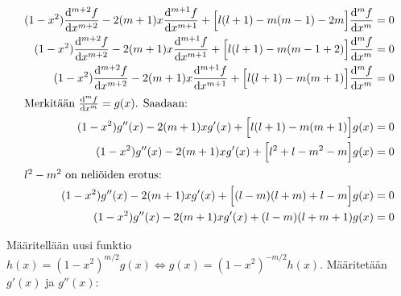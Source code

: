 \documentclass[../johdoksia.tex]{subfiles}
\begin{document}
	\begin{align*}
		(1 - x^2)\odv{^{m + 2}f}{x^{m + 2}} - 2(m + 1)x\odv{^{m + 1}f}{x^{m + 1}} + \Big[l(l + 1) - m(m - 1) - 2m\Big]\odv{^mf}{x^m} &= 0 \\
		(1 - x^2)\odv{^{m + 2}f}{x^{m + 2}} - 2(m + 1)x\odv{^{m + 1}f}{x^{m + 1}} + \Big[l(l + 1) - m(m - 1 + 2)\Big]\odv{^mf}{x^m} &= 0 \\
		(1 - x^2)\odv{^{m + 2}f}{x^{m + 2}} - 2(m + 1)x\odv{^{m + 1}f}{x^{m + 1}} + \Big[l(l + 1) - m(m + 1)\Big]\odv{^mf}{x^m} &= 0 \\
		\intertext{Merkitään $\odv{^mf}{x^m} = g(x)$. Saadaan:}
		(1 - x^2)g''(x) - 2(m + 1)xg'(x) + \Big[l(l + 1) - m(m + 1)\Big]g(x) &= 0 \\
		(1 - x^2)g''(x) - 2(m + 1)xg'(x) + \Big[l^2 + l - m^2 - m\Big]g(x) &= 0 \\
		\intertext{$l^2 - m^2$ on neliöiden erotus:}
		(1 - x^2)g''(x) - 2(m + 1)xg'(x) + \Big[(l - m)(l + m) + l - m\Big]g(x) &= 0 \\
		(1 - x^2)g''(x) - 2(m + 1)xg'(x) + (l - m)(l + m + 1)g(x) &= 0 \\
	\end{align*}

	\noindent Määritellään uusi funktio $h(x) = (1 - x^2)^{m/2}g(x) \iff g(x) = (1 - x^2)^{-m/2}h(x)$. Määritetään $g'(x)$ ja $g''(x)$:
	
\end{document}
